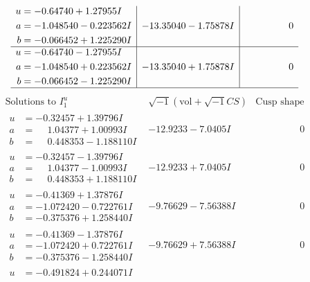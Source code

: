 \documentclass[1p]{elsarticle_modified}
\theoremstyle{definition}
\newcommand{\I}{\sqrt{-1}}
\begin{document}
$$\begin{array}{c|c|c}
\begin{aligned}
u &= -0.64740 + 1.27955 I \\
a &= -1.048540 - 0.223562 I \\
b &= -0.066452 + 1.225290 I\end{aligned}
 & -13.35040 - 1.75878 I & \phantom{-0.000000 } 0 \\ \hline\begin{aligned}
u &= -0.64740 - 1.27955 I \\
a &= -1.048540 + 0.223562 I \\
b &= -0.066452 - 1.225290 I\end{aligned}
 & -13.35040 + 1.75878 I & \phantom{-0.000000 } 0\\
 \hline 
 \end{array}$$\newpage$$\begin{array}{c|c|c}  
\text{Solutions to }I^u_{1}& \I (\text{vol} + \sqrt{-1}CS) & \text{Cusp shape}\\
 \hline 
\begin{aligned}
u &= -0.32457 + 1.39796 I \\
a &= \phantom{-}1.04377 + 1.00993 I \\
b &= \phantom{-}0.448353 - 1.188110 I\end{aligned}
 & -12.9233 - 7.0405 I & \phantom{-0.000000 } 0 \\ \hline\begin{aligned}
u &= -0.32457 - 1.39796 I \\
a &= \phantom{-}1.04377 - 1.00993 I \\
b &= \phantom{-}0.448353 + 1.188110 I\end{aligned}
 & -12.9233 + 7.0405 I & \phantom{-0.000000 } 0 \\ \hline\begin{aligned}
u &= -0.41369 + 1.37876 I \\
a &= -1.072420 - 0.722761 I \\
b &= -0.375376 + 1.258440 I\end{aligned}
 & -9.76629 - 7.56388 I & \phantom{-0.000000 } 0 \\ \hline\begin{aligned}
u &= -0.41369 - 1.37876 I \\
a &= -1.072420 + 0.722761 I \\
b &= -0.375376 - 1.258440 I\end{aligned}
 & -9.76629 + 7.56388 I & \phantom{-0.000000 } 0 \\ \hline\begin{aligned}
u &= -0.491824 + 0.244071 I \\

\end{aligned}
\end{array}$$
\end{document}
